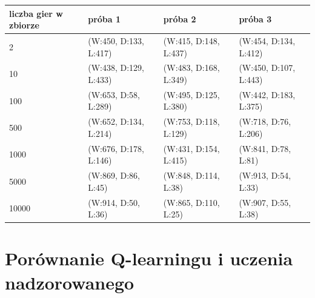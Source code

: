 \documentclass{article}
\begin{document}
\begin{center}
  \begin{tabular}{ | l | l | l | l | }
    \hline
    liczba gier w zbiorze & próba 1 & próba 2 & próba 3 \\ \hline
    2 & (W:450, D:133, L:417) & (W:415, D:148, L:437) & (W:454, D:134, L:412) \\ \hline
    10 & (W:438, D:129, L:433) & (W:483, D:168, L:349) & (W:450, D:107, L:443) \\ \hline
    100 & (W:653, D:58, L:289) & (W:495, D:125, L:380) & (W:442, D:183, L:375) \\ \hline
    500 & (W:652, D:134, L:214) & (W:753, D:118, L:129) & (W:718, D:76, L:206) \\ \hline
    1000 & (W:676, D:178, L:146) & (W:431, D:154, L:415) & (W:841, D:78, L:81) \\ \hline
    5000 & (W:869, D:86, L:45) & (W:848, D:114, L:38) & (W:913, D:54, L:33) \\ \hline
    10000 & (W:914, D:50, L:36) & (W:865, D:110, L:25) & (W:907, D:55, L:38) \\ \hline
  \end{tabular}
\end{center}


\section{Porównanie Q-learningu i uczenia nadzorowanego}
\end{document}
